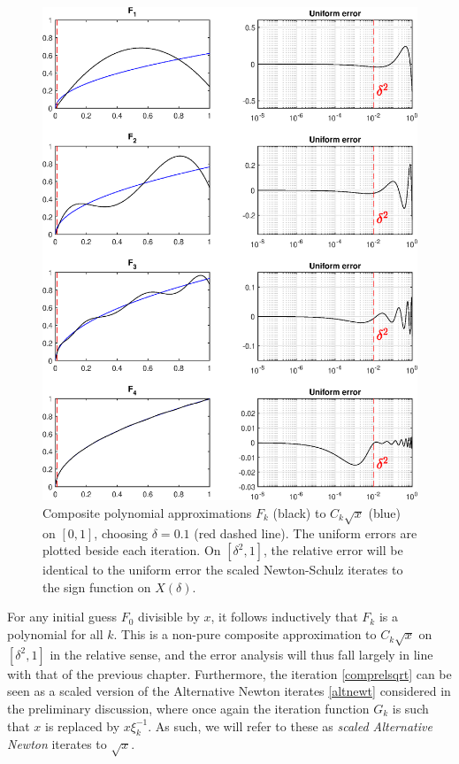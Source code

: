 \begin{figure}[t!]
\centering
   \includegraphics[width=\textwidth,height=\textheight,keepaspectratio]{figures/chapter_4/COMPSQRT_4ITERS_UNIF.eps}
   \caption{Composite polynomial approximations $F_k$ (black) to $C_k\sqrt{x}$ (blue) on $[0,1]$, choosing $\delta=0.1$ (red dashed line). The uniform errors are plotted beside each iteration. On $[\delta^2,1]$, the relative error will be identical to the uniform error the scaled Newton-Schulz iterates to the sign function on $X(\delta)$.}
   \label{fig:compsqrt3}
\end{figure}

\begin{rmk}
For any initial guess $F_0$ divisible by $x$, it follows inductively that $F_k$ is a polynomial for all $k$. This is a non-pure composite approximation to $C_k\sqrt{x}$ on $[\delta^2,1]$ in the relative sense, and the error analysis will thus fall largely in line with that of the previous chapter. Furthermore, the iteration \eqref{comprelsqrt} can be seen as a scaled version of the Alternative Newton iterates \eqref{altnewt} considered in the preliminary discussion, where once again the iteration function $G_k$ is such that $x$ is replaced by $x\xi_k^{-1}$. As such, we will refer to these as \textit{scaled Alternative Newton} iterates to $\sqrt{x}$.
\end{rmk}

